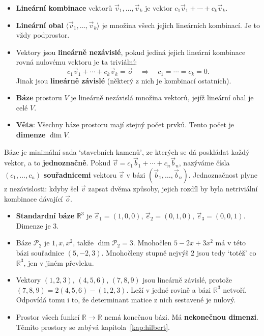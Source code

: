 \begin{definitionbox}
  \begin{itemize}
    \item \textbf{Lineární kombinace} vektorů $\vec{v}_1, \ldots, \vec{v}_k$ je vektor $c_1\vec{v}_1 + \cdots + c_k\vec{v}_k$.
    \item \textbf{Lineární obal} $\langle\vec{v}_1, \ldots, \vec{v}_k\rangle$ je množina všech jejich lineárních kombinací. Je to vždy podprostor.
    \item Vektory jsou \textbf{lineárně nezávislé}, pokud jediná jejich lineární kombinace rovná nulovému vektoru je ta triviální:
    \begin{equation*}
      c_1\vec{v}_1 + \cdots + c_k\vec{v}_k = \vec{o}\quad\Rightarrow\quad c_1 = \cdots = c_k = 0.
    \end{equation*}
    Jinak jsou \textbf{lineárně závislé} (některý z nich je kombinací ostatních).
    \item \textbf{Báze} prostoru $V$ je lineárně nezávislá množina vektorů, jejíž lineární obal je celé $V$.
    \item \textbf{Věta}: Všechny báze prostoru mají stejný počet prvků. Tento počet je \textbf{dimenze} $\dim V$.
  \end{itemize}
\end{definitionbox}

Báze je minimální sada `stavebních kamenů', ze kterých se dá poskládat každý vektor, a to \textbf{jednoznačně}. Pokud $\vec{v} = c_1\vec{b}_1 + \cdots + c_n\vec{b}_n$, nazýváme čísla $(c_1, \ldots, c_n)$ \textbf{souřadnicemi} vektoru $\vec{v}$ v bázi $(\vec{b}_1, \ldots, \vec{b}_n)$. Jednoznačnost plyne z nezávislosti: kdyby šel $\vec{v}$ zapsat dvěma způsoby, jejich rozdíl by byla netriviální kombinace dávající $\vec{o}$.

\begin{example}
  \begin{itemize}
    \item \textbf{Standardní báze} $\mathbb{R}^3$ je $\vec{e}_1 = (1, 0, 0)$, $\vec{e}_2 = (0, 1, 0)$, $\vec{e}_3 = (0, 0, 1)$. Dimenze je $3$.
    \item Báze $\mathcal{P}_2$ je $1, x, x^2$, takže $\dim\mathcal{P}_2 = 3$. Mnohočlen $5 - 2x + 3x^2$ má v této bázi souřadnice $(5, -2, 3)$. Mnohočleny stupně nejvýš $2$ jsou tedy `totéž' co $\mathbb{R}^3$, jen v jiném převleku.
    \item Vektory $(1, 2, 3)$, $(4, 5, 6)$, $(7, 8, 9)$ jsou lineárně závislé, protože $(7, 8, 9) = 2(4, 5, 6) - (1, 2, 3)$. Leží v jedné rovině a bázi $\mathbb{R}^3$ netvoří. Odpovídá tomu i to, že determinant matice z nich sestavené je nulový.
    \item Prostor všech funkcí $\mathbb{R}\to\mathbb{R}$ nemá konečnou bázi. Má \textbf{nekonečnou dimenzi}. Těmito prostory se zabývá kapitola~\ref{kap:hilbert}.
  \end{itemize}
\end{example}

